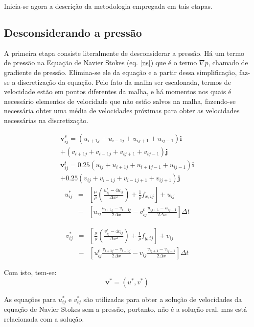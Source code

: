 \documentclass[journal]{IEEEtran}
\begin{document}
Inicia-se agora a descrição da metodologia empregada em tais etapas.

\subsection{Desconsiderando a pressão}
A primeira etapa consiste literalmente de desconsiderar a pressão. Há um termo de pressão na Equação de Navier Stokes (eq. \ref{ns}) que é o termo $\nabla p$, chamado de gradiente de pressão. Elimina-se ele da equação e a partir dessa simplificação, faz-se a discretização da equação. Pelo fato da malha ser escalonada, termos de velocidade estão em pontos diferentes da malha, e há momentos nos quais é necessário elementos de velocidade que não estão salvos na malha, fazendo-se necessária obter uma média de velocidades próximas para obter as velocidades necessárias na discretização.
 
\begin{eqnarray}
\textbf{v}_{ij}^s=(u_{i+1j}+u_{i-1j}+u_{ij+1}+u_{ij-1})\textbf{i} 
\nonumber \\+(v_{i+1j}+v_{i-1j}+v_{ij+1}+v_{ij-1})\textbf{j}\\
\textbf{v}_{ij}^t=0.25(u_{ij}+u_{i+1j}+u_{i+1j-1}+u_{ij-1})\textbf{i}\nonumber \\
+0.25(v_{ij}+v_{i-1j}+v_{i-1j+1}+v_{ij+1})\textbf{j}
\end{eqnarray}
\begin{eqnarray}
u_{ij}^{*}&=&\left[\frac{\mu}{\rho}\left(\frac{u_{ij}^s-4u_{ij}}{\Delta
x^2}\right)+\frac{1}{\rho}f_{x,ij}\right] + u_{ij}\nonumber \\
&-&\left[u_{ij}\frac{u_{i+1j}-u_{i-1j}}{2\Delta
x}-v_{ij}^t\frac{u_{ij+1}-u_{ij-1}}{2\Delta x}\right]\Delta t
\end{eqnarray}

\begin{eqnarray}
v_{ij}^{*}&=&\left[\frac{\mu}{\rho}\left(\frac{v_{ij}^s-4v_{ij}}{\Delta
x^2}\right)+\frac{1}{\rho}f_{y,ij}\right] + v_{ij}\nonumber \\
&-&\left[u_{ij}^t\frac{v_{i+1j}-v_{i-1j}}{2\Delta
x}-v_{ij}\frac{v_{ij+1}-v_{ij-1}}{2\Delta x}\right]\Delta t
\end{eqnarray}

Com isto, tem-se:
\[\textbf{v}^{*}=(u^*,v^*)\]

As equações para $u_{ij}^{*}$ e $v_{ij}^{*}$ são utilizadas para obter a solução de velocidades da equação de Navier Stokes sem a pressão, portanto, não é a solução real, mas está relacionada com a solução.
\end{document}
